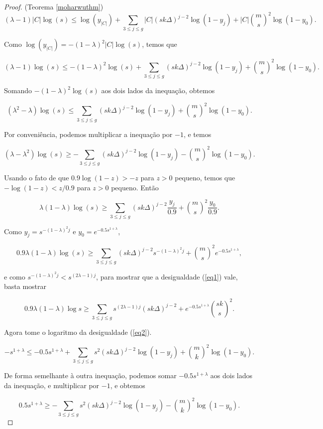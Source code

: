 \begin{proof}{(Teorema \ref{moharwuthm})}
\[(\lambda-1)|C|\log(s) \leq \log(y_{|C|}) + \sum_{3\leq j\leq g} |C|(sk\Delta)^{j-2}\log(1-y_j)+|C|\binom{m}{s}^2\log(1-y_0).\]

Como $\log(y_{|C|}) = -(1-\lambda)^2|C|\log(s)$, temos que

\[(\lambda-1)\log(s) \leq -(1-\lambda)^2\log(s)+\sum_{3\leq j\leq g} (sk\Delta)^{j-2}\log(1-y_j)+\binom{m}{s}^2\log(1-y_0).\]

Somando $-(1-\lambda)^2\log(s)$ aos dois lados da inequação, obtemos

\[(\lambda^2 - \lambda)\log(s) \leq \sum_{3\leq j\leq g} (sk\Delta)^{j-2}\log(1-y_j)+\binom{m}{s}^2\log(1-y_0).\]

Por conveniência, podemos multiplicar a inequação por $-1$, e temos

\[(\lambda - \lambda^2)\log(s) \geq -\sum_{3\leq j\leq g} (sk\Delta)^{j-2}\log(1-y_j)-\binom{m}{s}^2\log(1-y_0).\]

Usando o fato de que $0.9\log(1-z) > -z$ para $z>0$ pequeno, temos que $-\log(1-z) < z/0.9$ para $z>0$ pequeno. Então

\[\lambda(1 - \lambda)\log(s) \geq \sum_{3\leq j\leq g} (sk\Delta)^{j-2}\frac{y_j}{0.9}+\binom{m}{s}^2\frac{y_0}{0.9}.\]

Como $y_j = s^{-(1-\lambda)^{2}j}$ e $y_0 = e^{-0.5s^{1+\lambda}}$,

\[0.9\lambda(1 - \lambda)\log(s) \geq \sum_{3\leq j\leq g} (sk\Delta)^{j-2}s^{-(1-\lambda)^2j}+\binom{m}{s}^2e^{-0.5s^{1+\lambda}},\]

e como $s^{-(1-\lambda)^2j} < s^{(2\lambda - 1)j}$, para mostrar que a desigualdade (\ref{eq1}) vale, basta mostrar

\begin{equation}\label{eq3}
0.9\lambda(1-\lambda)\log s \geq \sum_{3\leq j\leq g}s^{(2\lambda-1)j}(sk\Delta)^{j-2}+e^{-0.5s^{1+\lambda}}\binom{sk}{s}^2.
\end{equation}

Agora tome o logaritmo da desigualdade (\ref{eq2}).

\[-s^{1+\lambda} \leq -0.5s^{1+\lambda} + \sum_{3\leq j \leq g} s^2(sk\Delta)^{j-2}\log(1-y_j) + \binom{m}{k}^2\log(1-y_0).\]

De forma semelhante à outra inequação, podemos somar $-0.5s^{1+\lambda}$ aos dois lados da inequação, e multiplicar por $-1$, e obtemos

\[0.5s^{1+\lambda} \geq -\sum_{3\leq j \leq g} s^2(sk\Delta)^{j-2}\log(1-y_j) - \binom{m}{k}^2\log(1-y_0).\]


\end{proof}
